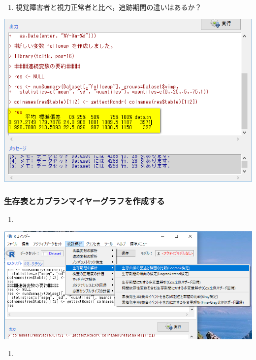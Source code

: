 \documentclass[11pt,]{problemset}
\providecommand{\tightlist}{%
  \setlength{\itemsep}{0pt}\setlength{\parskip}{0pt}}
\begin{document}
\begin{enumerate}
\def\labelenumi{\arabic{enumi}.}
\setcounter{enumi}{9}
\tightlist
\item
  視覚障害者と視力正常者と比べ，追跡期間の違いはあるか？
\end{enumerate}

\begin{center}\includegraphics[width=0.55\linewidth,height=0.35\textheight]{pic/survival0903} \end{center}

\subsubsection{生存表とカプランマイヤーグラフを作成する}

\begin{enumerate}
\def\labelenumi{\arabic{enumi}.}
\item
\end{enumerate}

\begin{center}\includegraphics[width=0.7\linewidth,height=0.35\textheight]{pic/survival07} \end{center}

\begin{enumerate}
\def\labelenumi{\arabic{enumi}.}
\setcounter{enumi}{1}
\item
\end{enumerate}
\end{document}
